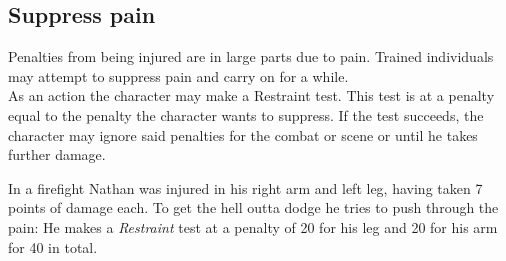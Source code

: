 \subsection{Suppress pain}
Penalties from being injured are in large parts due to pain. Trained individuals may attempt to suppress pain and carry on for a while.\\
As an action the character may make a Restraint test. This test is at a penalty equal to the penalty the character wants to suppress. If the test succeeds, the character may ignore said penalties for the combat or scene or until he takes further damage.
\begin{exampleblock}
	In a firefight Nathan was injured in his right arm and left leg, having taken 7 points of damage each. To get the hell outta dodge he tries to push through the pain: He makes a \emph{Restraint} test at a penalty of 20 for his leg and 20 for his arm for 40 in total.
\end{exampleblock}